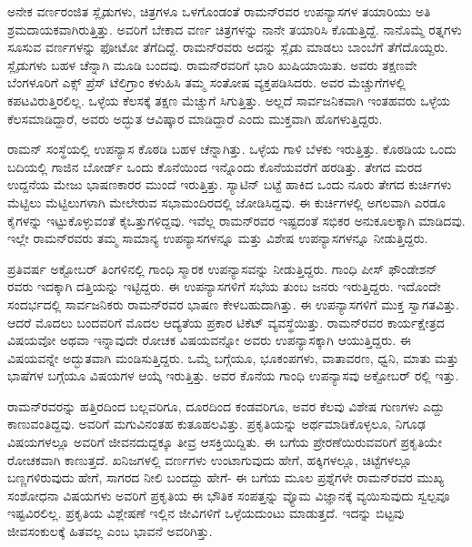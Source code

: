 ಅನೇಕ ವರ್ಣರಂಜಿತ ಸ್ಲೈಡುಗಳು, ಚಿತ್ರಗಳೂ ಒಳಗೊಂಡಂತೆ ರಾಮನ್‍ರವರ ಉಪನ್ಯಾಸಗಳ ತಯಾರಿಯು ಅತಿ ಶ್ರಮದಾಯಕವಾಗಿರುತ್ತಿತ್ತು. ಅವರಿಗೆ ಬೇಕಾದ ವರ್ಣ ಚಿತ್ರಗಳನ್ನು ನಾನೇ ತಯಾರಿಸಿ ಕೊಡುತ್ತಿದ್ದೆ. ನಾನೊಮ್ಮೆ ರತ್ನಗಳು ಸೂಸುವ ವರ್ಣಗಳನ್ನು ಫೋಟೋ ತೆಗೆದಿದ್ದೆ. ರಾಮನ್‍ರವರು ಅದನ್ನು ಸ್ಲೈಡು ಮಾಡಲು ಬಾಂಬೆಗೆ ತೆಗೆದೊಯ್ದರು. ಸ್ಲೈಡುಗಳು ಬಹಳ ಚೆನ್ನಾಗಿ ಮೂಡಿ ಬಂದವು. ರಾಮನ್‍ರವರಿಗೆ ಭಾರಿ ಖುಷಿಯಾಯಿತು. ಅವರು ತಕ್ಷಣವೇ ಬೆಂಗಳೂರಿಗೆ ಎಕ್ಸ್ ಪ್ರೆಸ್ ಟೆಲಿಗ್ರಾಂ ಕಳುಹಿಸಿ ತಮ್ಮ ಸಂತೋಷ ವ್ಯಕ್ತಪಡಿಸಿದರು. ಅವರ ಮೆಚ್ಚುಗೆಗಳಲ್ಲಿ ಕಪಟವಿರುತ್ತಿರಲಿಲ್ಲ. ಒಳ್ಳೆಯ ಕೆಲಸಕ್ಕೆ ತಕ್ಷಣ ಮೆಚ್ಚುಗೆ ಸಿಗುತ್ತಿತ್ತು. ಅಲ್ಲದೆ ಸಾರ್ವಜನಿಕವಾಗಿ ಇಂತಹವರು ಒಳ್ಳೆಯ ಕೆಲಸಮಾಡಿದ್ದಾರೆ, ಅವರು ಅದ್ಭುತ ಆವಿಷ್ಕಾರ ಮಾಡಿದ್ದಾರೆ ಎಂದು ಮುಕ್ತವಾಗಿ ಹೊಗಳುತ್ತಿದ್ದರು.

ರಾಮನ್ ಸಂಸ್ಥೆಯಲ್ಲಿ ಉಪನ್ಯಾಸ ಕೊಠಡಿ ಬಹಳ ಚೆನ್ನಾಗಿತ್ತು. ಒಳ್ಳೆಯ ಗಾಳಿ ಬೆಳಕು ಇರುತ್ತಿತ್ತು. ಕೊಠಡಿಯ ಒಂದು ಬದಿಯಲ್ಲಿ ಗಾಜಿನ ಬೋರ್ಡ್ ಒಂದು ಕೊನೆಯಿಂದ ಇನ್ನೊಂದು ಕೊನೆಯವರೆಗೆ ಹರಡಿತ್ತು. ತೇಗದ ಮರದ ಉದ್ದನೆಯ ಮೇಜು ಭಾಷಣಕಾರರ ಮುಂದೆ ಇರುತ್ತಿತ್ತು. ಸ್ಯಾಟಿನ್ ಬಟ್ಟೆ ಹಾಕಿದ ಒಂದು ನೂರು ತೇಗದ ಕುರ್ಚಿಗಳು ಮೆಟ್ಟಿಲು ಮೆಟ್ಟಿಲುಗಳಾಗಿ ಮೇಲೇರುವ ಸಭಾಮಂದಿರದಲ್ಲಿ ಜೋಡಿಸಿದ್ದವು. ಈ ಕುರ್ಚಿಗಳಲ್ಲಿ ಅಗಲವಾಗಿ ಎರಡೂ ಕೈಗಳನ್ನು ಇಟ್ಟುಕೊಳ್ಳುವಂತೆ ಕೈಒತ್ತುಗಳಿದ್ದವು. ಇವೆಲ್ಲ ರಾಮನ್‍ರವರ ಇಷ್ಟದಂತೆ ಸಭಿಕರ ಅನುಕೂಲಕ್ಕಾಗಿ ಮಾಡಿದವು. ಇಲ್ಲೇ ರಾಮನ್‍ರವರು ತಮ್ಮ ಸಾಮಾನ್ಯ ಉಪನ್ಯಾಸಗಳನ್ನೂ ಮತ್ತು ವಿಶೇಷ ಉಪನ್ಯಾಸಗಳನ್ನೂ ನೀಡುತ್ತಿದ್ದರು.

ಪ್ರತಿವರ್ಷ ಅಕ್ಟೋಬರ್ ತಿಂಗಳಿನಲ್ಲಿ ಗಾಂಧಿ ಸ್ಮಾರಕ ಉಪನ್ಯಾಸವನ್ನು ನೀಡುತ್ತಿದ್ದರು. ಗಾಂಧಿ ಪೀಸ್ ಫೌಂಡೇಶನ್ ರವರು ಇದಕ್ಕಾಗಿ ದತ್ತಿಯನ್ನು ಇಟ್ಟಿದ್ದರು. ಈ ಉಪನ್ಯಾಸಗಳಿಗೆ ಸಭೆಯ ತುಂಬ ಜನರು ಇರುತ್ತಿದ್ದರು. ಇದೊಂದೇ ಸಂದರ್ಭದಲ್ಲಿ ಸಾರ್ವಜನಿಕರು ರಾಮನ್‍ರವರ ಭಾಷಣ ಕೇಳಬಹುದಾಗಿತ್ತು. ಈ ಉಪನ್ಯಾಸಗಳಿಗೆ ಮುಕ್ತ ಸ್ವಾಗತವಿತ್ತು. ಆದರೆ ಮೊದಲು ಬಂದವರಿಗೆ ಮೊದಲ ಆದ್ಯತೆಯ ಪ್ರಕಾರ ಟಿಕೆಟ್ ವ್ಯವಸ್ಥೆಯಿತ್ತು. ರಾಮನ್‍ರವರ ಕಾರ್ಯಕ್ಷೇತ್ರದ ವಿಷಯವೋ ಅಥವಾ ಇನ್ನಾವುದೇ ರೋಚಕ ವಿಷಯವನ್ನೋ ಅವರು ಉಪನ್ಯಾಸಕ್ಕಾಗಿ ಆಯುತ್ತಿದ್ದರು. ಈ ವಿಷಯವನ್ನೇ ಅದ್ಭುತವಾಗಿ ಮಂಡಿಸುತ್ತಿದ್ದರು. ಒಮ್ಮೆ \textit{} ಬಗ್ಗೆಯೂ, ಭೂಕಂಪಗಳು, ವಾತಾವರಣ, ಧ್ವನಿ, ಮಾತು ಮತ್ತು ಭಾಷೆಗಳ ಬಗ್ಗೆಯೂ ವಿಷಯಗಳ ಆಯ್ಕೆ ಇರುತ್ತಿತ್ತು. ಅವರ ಕೊನೆಯ ಗಾಂಧಿ ಉಪನ್ಯಾಸವು ಅಕ್ಟೋಬರ್ ರಲ್ಲಿ ಇತ್ತು.



ರಾಮನ್‍ರವರನ್ನು ಹತ್ತಿರದಿಂದ ಬಲ್ಲವರಿಗೂ, ದೂರದಿಂದ ಕಂಡವರಿಗೂ, ಅವರ ಕೆಲವು ವಿಶೇಷ ಗುಣಗಳು ಎದ್ದು ಕಾಣುವಂತಿದ್ದವು. ಅವರಿಗೆ ಮಗುವಿನಂತಹ ಕುತೂಹಲವಿತ್ತು. ಪ್ರಕೃತಿಯನ್ನು ಅರ್ಥಮಾಡಿಕೊಳ್ಳಲೂ, ನಿಗೂಢ ವಿಷಯಗಳಲ್ಲೂ ಅವರಿಗೆ ಜೀವನದುದ್ದಕ್ಕೂ ತೀವ್ರ ಆಸಕ್ತಿಯಿದ್ದಿತು. ಈ ಬಗೆಯ ಪ್ರೇರಣೆಯಿರುವವರಿಗೆ ಪ್ರಕೃತಿಯೇ ರೋಚಕವಾಗಿ ಕಾಣುತ್ತದೆ. ಖನಿಜಗಳಲ್ಲಿ ವರ್ಣಗಳು ಉಂಟಾಗುವುದು ಹೇಗೆ, ಹಕ್ಕಿಗಳಲ್ಲೂ, ಚಿಟ್ಟೆಗಳಲ್ಲೂ ಬಣ್ಣಗಳಿರುವುದು ಹೇಗೆ, ಸಾಗರದ ನೀಲಿ ಬಂದದ್ದು ಹೇಗೆ- ಈ ಬಗೆಯ ಮೂಲ ಪ್ರಶ್ನೆಗಳೇ ರಾಮನ್‍ರವರ ಮುಖ್ಯ ಸಂಶೋಧನಾ ವಿಷಯಗಳು ಅವರಿಗೆ ಪ್ರಕೃತಿಯ ಈ ಭೌತಿಕ ಸಂಪತ್ತನ್ನು ವ್ಯೊಮ ವಿಜ್ಞಾನಕ್ಕೆ ವ್ಯಯಿಸುವುದು ಸ್ವಲ್ಪವೂ ಇಷ್ಟವಿರಲಿಲ್ಲ. ಪ್ರಕೃತಿಯ ವಿಶ್ಲೇಷಣೆ ಇಲ್ಲಿನ ಜೀವಿಗಳಿಗೆ ಒಳ್ಳೆಯದುಂಟು ಮಾಡುತ್ತದೆ. ಇದನ್ನು ಬಿಟ್ಟವು ಜೀವಸಂಕುಲಕ್ಕೆ ಹಿತವಲ್ಲ ಎಂಬ ಭಾವನೆ ಅವರಿಗಿತ್ತು.

